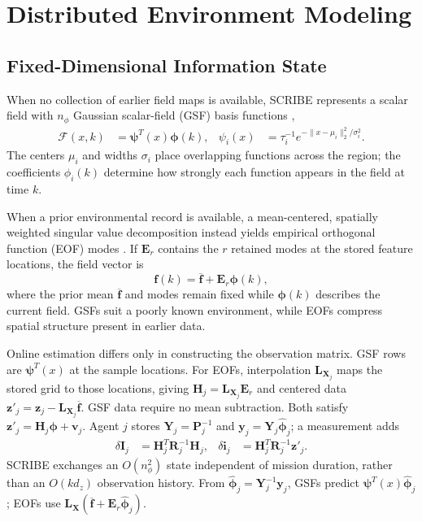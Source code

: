 \documentclass[letterpaper,10pt,conference]{ieeeconf}
\begin{document}
\section{Distributed Environment Modeling}

\subsection{Fixed-Dimensional Information State}

When no collection of earlier field maps is available, SCRIBE represents a
scalar field with $n_\phi$ Gaussian scalar-field (GSF) basis functions
\cite{pillonetto2019distributed,jadaliha2012environmental},
\begin{align}
    \mathcal{F}(x,k)
    &=\bm{\psi}^{T}(x)\bm{\phi}(k),
    &
    \psi_i(x)
    &=\tau_i^{-1}
      e^{-\lVert x-\mu_i\rVert_2^2/\sigma_i^2}.
    \label{eq:field-model}
\end{align}
The centers $\mu_i$ and widths $\sigma_i$ place overlapping functions across
the region; the coefficients $\phi_i(k)$ determine how strongly each function
appears in the field at time $k$.

When a prior environmental record is available, a mean-centered, spatially
weighted singular value decomposition instead yields empirical orthogonal
function (EOF) modes \cite{young2024greedy}. If $\bm E_r$ contains the $r$
retained modes at the stored feature locations, the field vector is
\begin{equation}
    \bm f(k)=\overline{\bm f}+\bm E_r\bm\phi(k),
    \label{eq:eof-field-model}
\end{equation}
where the prior mean $\overline{\bm f}$ and modes remain fixed while
$\bm\phi(k)$ describes the current field. GSFs suit a poorly known environment,
while EOFs compress spatial structure present in earlier data.

Online estimation differs only in constructing the observation matrix. GSF
rows are $\bm\psi^T(x)$ at the sample locations. For EOFs, interpolation
$\bm L_{\bm X_j}$ maps the stored grid to those locations, giving
$\bm H_j=\bm L_{\bm X_j}\bm E_r$ and centered data
$\bm z'_j=\bm z_j-\bm L_{\bm X_j}\overline{\bm f}$. GSF data require no mean
subtraction. Both satisfy $\bm z'_j=\bm H_j\bm\phi+\bm v_j$. Agent $j$ stores
$\bm Y_j=\bm P_j^{-1}$ and $\bm y_j=\bm Y_j\hat{\bm\phi}_j$; a measurement adds
\begin{align}
    \delta\bm{I}_j
    &=\bm{H}_j^T\bm{R}_j^{-1}\bm{H}_j,
    &
    \delta\bm{i}_j
    &=\bm{H}_j^T\bm{R}_j^{-1}\bm{z}'_j.
    \label{eq:information-innovation}
\end{align}
SCRIBE exchanges an $O(n_\phi^2)$ state independent of mission duration,
rather than an $O(kd_z)$ observation history. From
$\hat{\bm\phi}_j=\bm Y_j^{-1}\bm y_j$, GSFs predict
$\bm\psi^T(x)\hat{\bm\phi}_j$; EOFs use
$\bm L_{\bm X}(\overline{\bm f}+\bm E_r\hat{\bm\phi}_j)$.
\vspace{-0.5cm}
\end{document}
